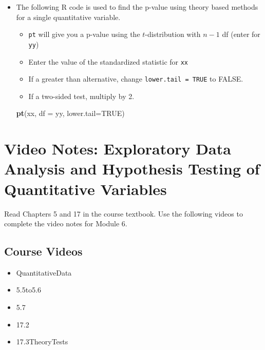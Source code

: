 \documentclass[
]{report}
\newenvironment{Shaded}{\begin{snugshade}}{\end{snugshade}}
\newcommand{\AttributeTok}[1]{\textcolor[rgb]{0.13,0.29,0.53}{#1}}
\newcommand{\ConstantTok}[1]{\textcolor[rgb]{0.56,0.35,0.01}{#1}}
\newcommand{\FunctionTok}[1]{\textcolor[rgb]{0.13,0.29,0.53}{\textbf{#1}}}
\newcommand{\NormalTok}[1]{#1}
\begin{document}
\newpage

\begin{itemize}
\item
  The following R code is used to find the p-value using theory based methods for a single quantitative variable.

  \begin{itemize}
  \item
    \texttt{pt} will give you a p-value using the \(t\)-distribution with \(n-1\) df (enter for \texttt{yy})
  \item
    Enter the value of the standardized statistic for \texttt{xx}
  \item
    If a greater than alternative, change \texttt{lower.tail\ =\ TRUE} to FALSE.
  \item
    If a two-sided test, multiply by 2.
  \end{itemize}

\begin{Shaded}
\begin{Highlighting}[]
\FunctionTok{pt}\NormalTok{(xx, }\AttributeTok{df =}\NormalTok{ yy, }\AttributeTok{lower.tail=}\ConstantTok{TRUE}\NormalTok{)}
\end{Highlighting}
\end{Shaded}
\end{itemize}

\newpage

\section{Video Notes: Exploratory Data Analysis and Hypothesis Testing of Quantitative Variables}\label{video-notes-exploratory-data-analysis-and-hypothesis-testing-of-quantitative-variables}

Read Chapters 5 and 17 in the course textbook. Use the following videos to complete the video notes for Module 6.

\subsection{Course Videos}\label{course-videos}

\begin{itemize}
\item
  QuantitativeData
\item
  5.5to5.6
\item
  5.7
\item
  17.2
\item
  17.3TheoryTests
\end{itemize}
\end{document}
